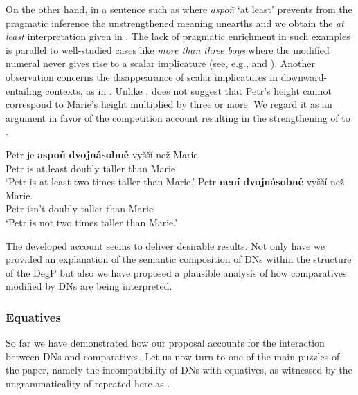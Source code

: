 \documentclass[output=paper,
modfonts,
hidelinks,
newtxmath
]{langscibook}
\begin{document}
\noindent On the other hand, in a sentence such as  where \textit{aspoň} `at least' prevents from the pragmatic inference the unstrengthened meaning unearths and we obtain the \textit{at least} interpretation given in . The lack of pragmatic enrichment in such examples is parallel to well-studied cases like \textit{more than three boys} where the modified numeral never gives rise to a scalar implicature (see, e.g., \citealt{krifka_at_1999} and \citealt{schulz_pragmatic_2006}). Another observation concerns the disappearance of scalar implicatures in downward-entailing contexts, as in . Unlike ,  does not suggest that Petr's height cannot correspond to Marie's height multiplied by three or more. We regard it as an argument in favor of the competition account resulting in the strengthening of  to .

\ea \ea \gll\label{aspon}Petr je \textbf{aspoň} \textbf{dvojnásobně} vyšší než Marie.\label{comp-at-least}\\
Petr is at.least doubly taller than Marie\\
\glt `Petr is at least two times taller than Marie.'
\ex \gll \label{neni}Petr \textbf{není} \textbf{dvojnásobně} vyšší než Marie.\\
Petr isn't doubly taller than Marie\\
\glt `Petr is not two times taller than Marie.'
\z \z

\noindent The developed account seems to deliver desirable results. Not only have we provided an explanation of the semantic composition of DNs within the structure of the DegP but also we have proposed a plausible analysis of how comparatives modified by DNs are being interpreted.

\subsubsection{Equatives}\label{equatives}

So far we have demonstrated how our proposal accounts for the interaction between DNs and comparatives. Let us now turn to one of the main puzzles of the paper, namely the incompatibility of DNs with equatives, as witnessed by the ungrammaticality of  repeated here as .

\z
\end{document}
